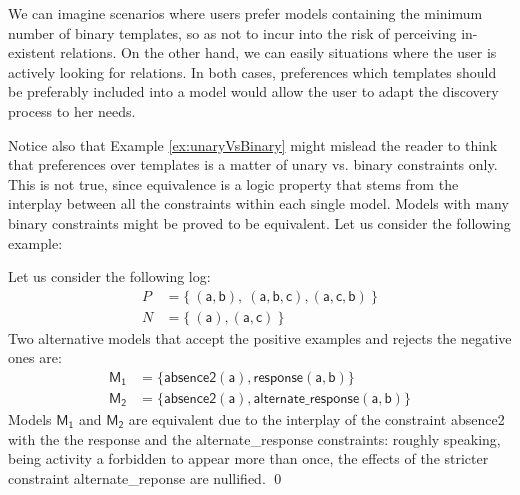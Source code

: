 We can imagine scenarios where users prefer models containing the minimum number of binary templates, so as not to incur into the risk of perceiving in-existent relations. On the other hand, we can easily  %
 situations where the user is actively looking for %
 relations. In both cases, preferences  
 which \btext{\declare} templates should be preferably included into a model would allow the user to adapt the discovery process to her needs.

Notice also that Example \ref{ex:unaryVsBinary} might mislead the reader to think that preferences over templates is a matter of unary vs. binary constraints only. This is not true, since equivalence is a logic property that stems from the interplay between all the constraints within each single model. Models with many binary constraints might be proved to be equivalent. Let us consider the following example:

\begin{example}
\label{ex:alternateVsResponseEquiv}
Let us consider the following log:
\begin{align*}
P & = \{\ (\mathsf{a}, \mathsf{b}),\ (\mathsf{a}, \mathsf{b}, \mathsf{c}),(\mathsf{a}, \mathsf{c}, \mathsf{b})\ \} \\
N & = \{\ (\mathsf{a}), (\mathsf{a}, \mathsf{c})\ \}
\end{align*}
%
Two alternative models that accept the positive examples and rejects the negative ones are:
\begin{align*}
\mathsf{M_1} & = \{ \mathsf{absence2(a),response(a,b)}\} \\
\mathsf{M_2} & = \{ \mathsf{absence2(a),alternate\_response(a, b)}\}
\end{align*}
Models $\mathsf{M_1}$ and $\mathsf{M_2}$ are equivalent due to the interplay of the constraint \textsf{absence2} with the the \textsf{response} and the \textsf{alternate\_response} constraints: roughly speaking, being activity \textsf{a} forbidden to appear more than once, the effects of the stricter constraint \textsf{alternate\_reponse} are nullified.
\qed
\end{example}



